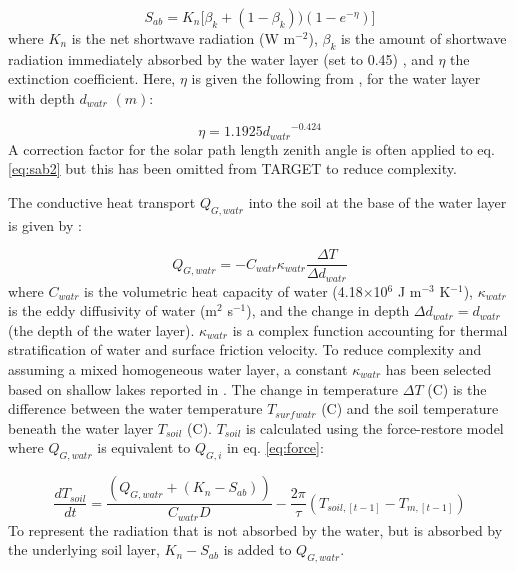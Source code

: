 \documentclass[journal abbreviation, manuscript]{copernicus}
\begin{document}
\begin{equation} 
\ensuremath{S_{ab}} = \ensuremath{K_{n}} \big[ \ensuremath{\beta_{k}} + (1 - \ensuremath{\beta_{k}}) )(1-e^{-\ensuremath{\eta}})  \big]
\label{eq:sab2} \end{equation} where \ensuremath{K_{n}} is the net shortwave radiation (W m$^{-2}$), \ensuremath{\beta_{k}} is the amount of shortwave radiation immediately absorbed by the water layer (set to 0.45) \citep{MolinaMartinez2006}, and \ensuremath{\eta} the extinction coefficient. Here, \ensuremath{\eta} is given the following from \cite{Subin2012a}, for the water layer with depth \ensuremath{d_{watr}} $(m)$:

\begin{equation} 
\ensuremath{\eta} = 1.1925 \ensuremath{d_{watr}}^{-0.424}
\label{eq:eta} \end{equation} A correction factor for the solar path length zenith angle is often applied to eq. \ref{eq:sab2} \citep{MolinaMartinez2006} but this has been omitted from TARGET to reduce complexity. 

The conductive heat transport \ensuremath{Q_{G,watr}} into the soil at the base of the water layer is given by \cite{MolinaMartinez2006}:

\begin{equation} 
\ensuremath{Q_{G,watr}} = - \ensuremath{C_{watr}} \ensuremath{\kappa_{watr}} \frac{\Delta T}{\Delta \ensuremath{d_{watr}}}
\label{eq:gwatr} \end{equation} where \ensuremath{C_{watr}} is the volumetric heat capacity of water (4.18$\times$10$^{6}$ J m$^{-3}$ K$^{-1}$), \ensuremath{\kappa_{watr}} is the eddy diffusivity of water (m$^{2}$ s$^{-1}$), 
and the change in depth $\Delta \ensuremath{d_{watr}} = \ensuremath{d_{watr}}$ (the depth of the water layer). \ensuremath{\kappa_{watr}} is a complex function accounting for thermal stratification of water and surface friction velocity. To reduce complexity and assuming a mixed homogeneous water layer, a constant \ensuremath{\kappa_{watr}} has been selected based on shallow lakes reported in \cite{SalasDeLeon2016}. The change in temperature $\Delta T$ (\degree C) is the difference between the water temperature $T_{surf}$$_{watr}$ (\degree C) and the soil temperature beneath the water layer \ensuremath{T_{soil}} (\degree C). \ensuremath{T_{soil}} is calculated using the force-restore model where \ensuremath{Q_{G,watr}} is equivalent to \ensuremath{Q_{G,i}} in eq. \ref{eq:force}:

\begin{equation}
\frac{d \ensuremath{T_{soil}}}{d t}= \frac{(\ensuremath{Q_{G,watr}} + (\ensuremath{K_{n}} - \ensuremath{S_{ab}}))}{C_{watr} D} - \frac{2 \pi}{\tau} (T_{soil,[t-1]} - T_{m,[t-1]})
\end{equation} To represent the radiation that is not absorbed by the water, but is absorbed by the underlying soil layer, $\ensuremath{K_{n}} - \ensuremath{S_{ab}}$ is added to \ensuremath{Q_{G,watr}}.
\end{document}
